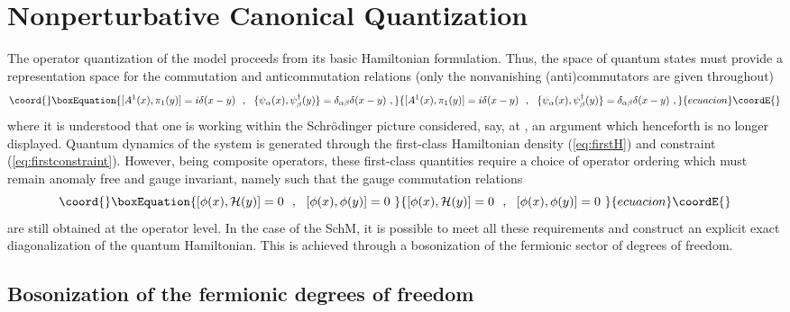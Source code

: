 \documentclass[a4paper,11pt]{article}
\begin{document}
\section{Nonperturbative Canonical Quantization}
\label{Sect4}

The operator quantization of the model proceeds from its basic Hamiltonian
formulation. Thus, the space of quantum states must provide a representation
space for the commutation and anticommutation relations (only the
nonvanishing (anti)commutators are given throughout)
\begin{equation}\coord{}\boxEquation{
[A^1(x),\pi_1(y)]=i\delta(x-y)\ \ ,\ \ 
\{\psi_\alpha(x),\psi^\dagger_\beta(y)\}=\delta_{\alpha\beta}\delta(x-y)\ ,
\label{eq:commutations}
}{
[A^1(x),\pi_1(y)]=i\delta(x-y)\ \ ,\ \ 
\{\psi_\alpha(x),\psi^\dagger_\beta(y)\}=\delta_{\alpha\beta}\delta(x-y)\ ,
}{ecuacion}\coordE{}\end{equation}
where it is understood that one is working within the Schr\"odinger picture
considered, say, at \coordHE{}, an argument which henceforth is no longer displayed.
Quantum dynamics of the system is generated through the first-class
Hamiltonian density (\ref{eq:firstH}) and constraint
(\ref{eq:firstconstraint}). However, being composite ope\-ra\-tors, these
first-class quantities require a choice of operator ordering which must
remain anomaly free and gauge invariant, namely such that the gauge 
commutation relations
\begin{equation}\coord{}\boxEquation{
[\phi(x),{\cal H}(y)]=0\ \ ,\ \ 
[\phi(x),\phi(y)]=0\ 
}{
[\phi(x),{\cal H}(y)]=0\ \ ,\ \ 
[\phi(x),\phi(y)]=0\ 
}{ecuacion}\coordE{}\end{equation}
are still obtained at the operator level. In the case of the SchM, it is
possible to meet all these requirements and construct an explicit
exact diagonalization of the quantum Hamiltonian. This is achieved
through a bosonization of the fermionic sector of degrees of 
freedom.\cite{Manton,Hetrick}

\subsection{Bosonization of the fermionic degrees of freedom}
\end{document}
